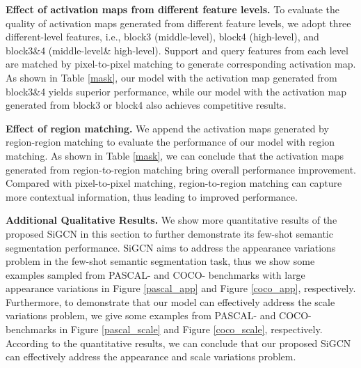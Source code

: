 \documentclass{bmvc2k}
\begin{document}
\textbf{Effect of activation maps from different feature levels.}
To evaluate the quality of activation maps generated from different feature levels, we adopt three different-level features, i.e., block3 (middle-level), block4 (high-level), and block3\&4 (middle-level\& high-level). Support and query features from each level are matched by pixel-to-pixel matching to generate corresponding activation map. As shown in Table \ref{mask}, our model with the activation map generated from block3\&4 yields superior performance, while our model with the activation map generated from block3 or block4 also achieves competitive results.

\textbf{Effect of region matching.}
We append the activation maps generated by region-region matching to evaluate the performance of our model with region matching. As shown in Table \ref{mask}, we can conclude that the activation maps generated from region-to-region matching bring overall performance improvement. Compared with pixel-to-pixel matching, region-to-region matching can capture more contextual information, thus leading to improved performance.
\begin{table}[!h]
\centering
\caption{Ablation study on the different activation maps on the PASCAL- dataset.}
\label{mask}
\end{table} 
\textbf{Additional Qualitative Results.}
We show more quantitative results of the proposed SiGCN in this section to further demonstrate its few-shot semantic segmentation performance. SiGCN aims to address the appearance variations problem in the few-shot semantic segmentation task, thus we show some examples sampled from PASCAL- and COCO- benchmarks with large appearance variations in Figure \ref{pascal_app} and Figure \ref{coco_app}, respectively. Furthermore, to demonstrate that our model can effectively address the scale variations problem, we give some examples from PASCAL- and COCO- benchmarks in Figure \ref{pascal_scale} and Figure \ref{coco_scale}, respectively. According to the quantitative results, we can conclude that our proposed SiGCN can effectively address the appearance and scale variations problem.
\end{document}
